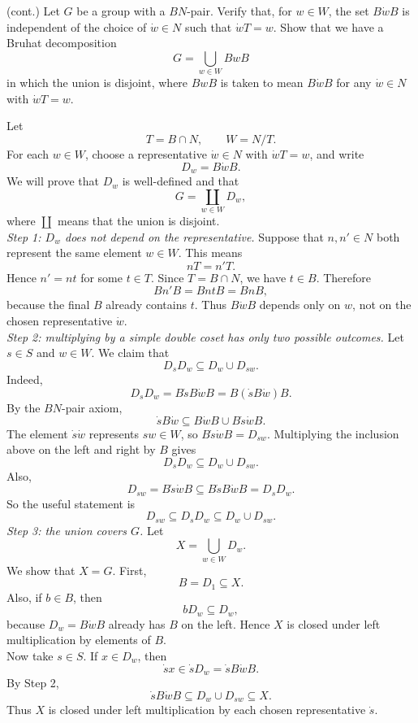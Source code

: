 \documentclass[../Odyssey_Project.tex]{subfiles}
\begin{document}
\begin{exercise}
\label{ex:4.9}
(cont.) Let $G$ be a group with a $BN$-pair. Verify that, for $w \in W$, the set $B \dot{w} B$ is independent of the choice of $\dot{w} \in N$ such that $\dot{w} T = w$. Show that we have a Bruhat decomposition
\[
G = \bigcup_{w \in W} BwB
\]
in which the union is disjoint, where $BwB$ is taken to mean $B \dot{w} B$ for any $\dot{w} \in N$ with $\dot{w} T = w$.
\end{exercise}
\begin{solution}
Let
\[
    T=B\cap N,
    \qquad
    W=N/T.
\]
For each $w\in W$, choose a representative $\dot w\in N$ with $\dot wT=w$, and write
\[
    D_w=B\dot wB.
\]
We will prove that $D_w$ is well-defined and that
\[
    G=\coprod_{w\in W}D_w,
\]
where $\coprod$ means that the union is disjoint.\\
\emph{Step 1: $D_w$ does not depend on the representative.} Suppose that $n,n'\in N$ both represent the same element $w\in W$. This means
\[
    nT=n'T.
\]
Hence $n'=nt$ for some $t\in T$. Since $T=B\cap N$, we have $t\in B$. Therefore
\[
    Bn'B
    =
    BntB
    =
    BnB,
\]
because the final $B$ already contains $t$. Thus $B\dot wB$ depends only on $w$, not on the chosen representative $\dot w$.\\
\emph{Step 2: multiplying by a simple double coset has only two possible outcomes.} Let $s\in S$ and $w\in W$. We claim that
\[
    D_sD_w\subseteq D_w\cup D_{sw}.
\]
Indeed,
\[
    D_sD_w
    =
    B\dot sB\dot wB
    =
    B(\dot sB\dot w)B.
\]
By the $BN$-pair axiom,
\[
    \dot sB\dot w\subseteq B\dot wB\cup B\dot s\dot wB.
\]
The element $\dot s\dot w$ represents $sw\in W$, so $B\dot s\dot wB=D_{sw}$. Multiplying the inclusion above on the left and right by $B$ gives
\[
    D_sD_w\subseteq D_w\cup D_{sw}.
\]
Also,
\[
    D_{sw}
    =
    B\dot s\dot wB
    \subseteq
    B\dot sB\dot wB
    =
    D_sD_w.
\]
So the useful statement is
\[
    D_{sw}\subseteq D_sD_w\subseteq D_w\cup D_{sw}.
\]
\emph{Step 3: the union covers $G$.} Let
\[
    X=\bigcup_{w\in W}D_w.
\]
We show that $X=G$. First,
\[
    B=D_1\subseteq X.
\]
Also, if $b\in B$, then
\[
    bD_w\subseteq D_w,
\]
because $D_w=B\dot wB$ already has $B$ on the left. Hence $X$ is closed under left multiplication by elements of $B$.\\
Now take $s\in S$. If $x\in D_w$, then
\[
    \dot s x\in \dot sD_w=\dot sB\dot wB.
\]
By Step 2,
\[
    \dot sB\dot wB\subseteq D_w\cup D_{sw}\subseteq X.
\]
Thus $X$ is closed under left multiplication by each chosen representative $\dot s$.\\

\end{solution}
\end{document}
